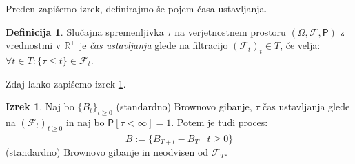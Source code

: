 \documentclass[11pt]{article}
\theoremstyle{definition}
\newtheorem{definicija}{Definicija}
\newtheorem{izrek}{Izrek}
\theoremstyle{plain}
\newcommand{\f}{\mathcal{F}}
\begin{document}
    Preden zapišemo izrek, definirajmo še pojem časa ustavljanja.
    
    \begin{definicija}
        Slučajna spremenljivka $\tau$ na verjetnostnem prostoru $(\Omega,\f,\mathsf{P})$ z vrednostmi v $\mathbb{R}^+$
        je \emph{čas ustavljanja} glede na filtracijo $(\f_t)_t\in T$, če velja: $\forall t\in T:\{\tau \leq t\}\in \f_t$.
    \end{definicija}
    
    Zdaj lahko zapišemo izrek \ref{thm:stopped_brownian}. %
    
    \begin{izrek}
        \label{thm:stopped_brownian}
        Naj bo $\{B_t\}_{t \geq 0}$ (standardno) Brownovo gibanje, $\tau$ čas ustavljanja glede na 
        $(\f_t)_{t \geq 0}$ in naj bo $\mathsf{P}[\tau<\infty]=1$.
        Potem je tudi proces:
        \[
        \hat{B} := \{B_{T+t} - B_T \mid t \geq 0\}
        \]
        (standardno) Brownovo gibanje in neodvisen od $\f_T$.
    \end{izrek}
    
    
\end{document}

